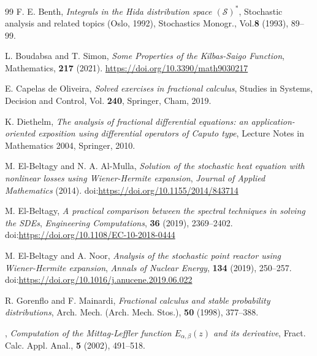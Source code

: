 \documentclass[12pt, reqno]{amsart}
\begin{document}
\begin{thebibliography}{99}
 {F. E. Benth}, {\em Integrals in the {H}ida distribution space {$({\mathscr{S}})^*$}}, {Stochastic analysis and related topics ({O}slo, 1992)}, {Stochastics Monogr.},
    Vol.{\bf 8} (1993), {89--99}.


 L. Boudabsa and T. Simon, {\em Some Properties of the Kilbas-Saigo Function}, Mathematics, {\bf 217} (2021). \url{https://doi.org/10.3390/math9030217}


  {E. Capelas de Oliveira}, {\em Solved exercises in fractional calculus}, {Studies in Systems, Decision and Control},
    Vol. {\bf 240}, {Springer, Cham}, {2019}.

 K. Diethelm, {\em The analysis of fractional differential equations: an application-oriented exposition using differential
operators of Caputo type}, Lecture Notes in Mathematics 2004, Springer, 2010.

 M. El-Beltagy and N. A. Al-Mulla, {\em Solution of the stochastic heat equation with nonlinear losses using Wiener-Hermite expansion}, \textit{Journal of Applied Mathematics} (2014). doi:\url{https://doi.org/10.1155/2014/843714}

 M. El-Beltagy, {\em A practical comparison between the spectral techniques in solving the SDEs}, \textit{Engineering Computations}, {\bf 36} (2019), 2369--2402. doi:\url{https://doi.org/10.1108/EC-10-2018-0444}

 M. El-Beltagy and A. Noor, {\em Analysis of the stochastic point reactor using Wiener-Hermite expansion},  \textit{Annals of Nuclear Energy}, {\bf 134} (2019), 250--257. doi:\url{https://doi.org/10.1016/j.anucene.2019.06.022}

 {R. Gorenflo and F. Mainardi}, {\em Fractional calculus and stable probability distributions}, {Arch. Mech. (Arch. Mech. Stos.)}, {\bf 50} (1998), {377--388}.

,  {\em Computation of the {M}ittag-{L}effler function
              {$E_{\alpha,\beta}(z)$} and its derivative}, {Fract. Calc. Appl. Anal.}, {\bf 5} (2002), {491--518}.


\end{thebibliography}
\end{document}

